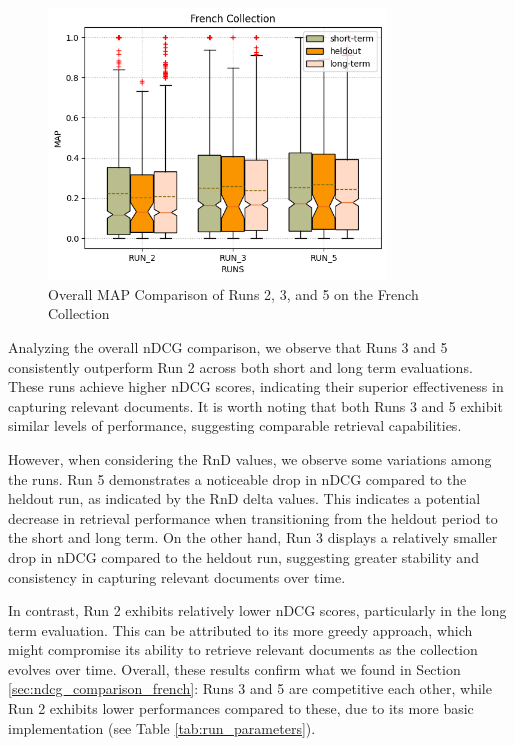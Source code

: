 \begin{figure}[!h]
    \centering
    \includegraphics[width=0.8\textwidth]{figure/StatisticalAnalysis/BoxPlot/MAP French.png}
    \caption{Overall MAP Comparison of Runs 2, 3, and 5 on the French Collection}
    \label{fig:map_french}
\end{figure}

Analyzing the overall \ac{nDCG} comparison, we observe that Runs 3 and 5 consistently outperform Run 2 across both short and long term evaluations. 
These runs achieve higher \ac{nDCG} scores, indicating their superior effectiveness in capturing relevant documents. 
It is worth noting that both Runs 3 and 5 exhibit similar levels of performance, suggesting comparable retrieval capabilities.

However, when considering the RnD values, we observe some variations among the runs. Run 5 demonstrates a noticeable drop in \ac{nDCG} compared to the heldout run, as indicated by the RnD delta values. 
This indicates a potential decrease in retrieval performance when transitioning from the heldout period to the short and long term. 
On the other hand, Run 3 displays a relatively smaller drop in \ac{nDCG} compared to the heldout run, suggesting greater stability and consistency in capturing relevant documents over time.

In contrast, Run 2 exhibits relatively lower \ac{nDCG} scores, particularly in the long term evaluation. This can be attributed to its more greedy approach, which might compromise its ability to retrieve relevant documents as the collection evolves over time.
Overall, these results confirm what we found in Section \ref{sec:ndcg_comparison_french}: Runs 3 and 5 are competitive each other, while Run 2 exhibits lower performances compared to these, due to its more basic implementation (see Table \ref{tab:run_parameters}). 

